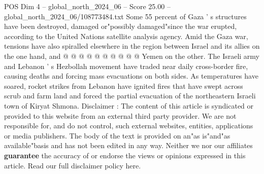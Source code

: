 \begin{textsample}{POS Dim 4 – global\_north\_2024\_06 – Score 25.00 – global\_north\_2024\_06/108773484.txt}
Some 55 percent of Gaza ' s structures have been destroyed, damaged or"possibly damaged"since the war erupted, according to the United Nations satellite analysis agency.
Amid the Gaza war, tensions have also spiralled elsewhere in the region between Israel and its allies on the one hand, and @ @ @ @ @ @ @ @ @ @ Yemen on the other.
The Israeli army and Lebanon ' s Hezbollah movement have traded near daily cross-border fire, causing deaths and forcing mass evacuations on both sides.
As temperatures have soared, rocket strikes from Lebanon have ignited fires that have swept across scrub and farm land and forced the partial evacuation of the northeastern Israeli town of Kiryat Shmona.
Disclaimer : The content of this article is syndicated or provided to this website from an external third party provider.
We are not responsible for, and do not control, such external websites, entities, applications or media publishers.
The body of the text is provided on an"as is"and"as available"basis and has not been edited in any way.
Neither we nor our affiliates \textbf{guarantee} the accuracy of or endorse the views or opinions expressed in this article.
Read our full disclaimer policy here.

\end{textsample}
